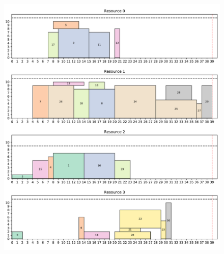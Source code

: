\documentclass[aspectratio=169]{beamer}
\begin{document}
\begin{frame}
\begin{columns}[c]
		\begin{figure}
			\centering
			\includegraphics[scale=0.25]{example_plot_sa_swap.pdf}
		\end{figure}	

	\end{columns}
\end{frame}

\end{document}
